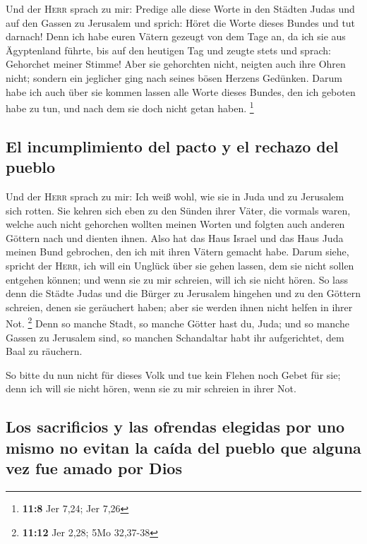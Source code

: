  Und der \textsc{Herr} sprach zu mir: Predige alle diese
Worte in den Städten Judas und auf den Gassen zu Jerusalem und sprich:
Höret die Worte dieses Bundes und tut darnach!  Denn ich
habe euren Vätern gezeugt von dem Tage an, da ich sie aus Ägyptenland
führte, bis auf den heutigen Tag und zeugte stets und sprach: Gehorchet
meiner Stimme!  Aber sie gehorchten nicht, neigten auch
ihre Ohren nicht; sondern ein jeglicher ging nach seines bösen Herzens
Gedünken. Darum habe ich auch über sie kommen lassen alle Worte dieses
Bundes, den ich geboten habe zu tun, und nach dem sie doch nicht getan
haben. \footnote{\textbf{11:8} Jer 7,24; Jer 7,26}

\hypertarget{el-incumplimiento-del-pacto-y-el-rechazo-del-pueblo}{%
\subsection{El incumplimiento del pacto y el rechazo del
pueblo}\label{el-incumplimiento-del-pacto-y-el-rechazo-del-pueblo}}

 Und der \textsc{Herr} sprach zu mir: Ich weiß wohl, wie
sie in Juda und zu Jerusalem sich rotten.  Sie kehren
sich eben zu den Sünden ihrer Väter, die vormals waren, welche auch
nicht gehorchen wollten meinen Worten und folgten auch anderen Göttern
nach und dienten ihnen. Also hat das Haus Israel und das Haus Juda
meinen Bund gebrochen, den ich mit ihren Vätern gemacht habe.
 Darum siehe, spricht der \textsc{Herr}, ich will ein
Unglück über sie gehen lassen, dem sie nicht sollen entgehen können; und
wenn sie zu mir schreien, will ich sie nicht hören.  So
lass denn die Städte Judas und die Bürger zu Jerusalem hingehen und zu
den Göttern schreien, denen sie geräuchert haben; aber sie werden ihnen
nicht helfen in ihrer Not. \footnote{\textbf{11:12} Jer 2,28; 5Mo
  32,37-38}  Denn so manche Stadt, so manche Götter hast
du, Juda; und so manche Gassen zu Jerusalem sind, so manchen Schandaltar
habt ihr aufgerichtet, dem Baal zu räuchern.

 So bitte du nun nicht für dieses Volk und tue kein
Flehen noch Gebet für sie; denn ich will sie nicht hören, wenn sie zu
mir schreien in ihrer Not.

\hypertarget{los-sacrificios-y-las-ofrendas-elegidas-por-uno-mismo-no-evitan-la-cauxedda-del-pueblo-que-alguna-vez-fue-amado-por-dios}{%
\subsection{Los sacrificios y las ofrendas elegidas por uno mismo no
evitan la caída del pueblo que alguna vez fue amado por
Dios}\label{los-sacrificios-y-las-ofrendas-elegidas-por-uno-mismo-no-evitan-la-cauxedda-del-pueblo-que-alguna-vez-fue-amado-por-dios}}

